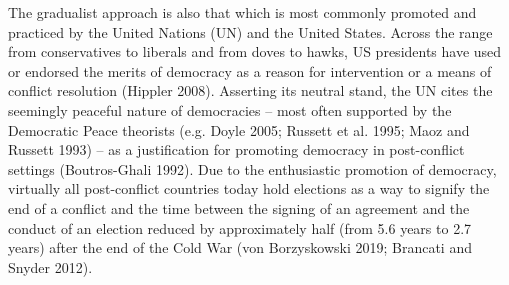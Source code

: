 \documentclass [11pt]{article}
\begin{document}
The gradualist approach is also that which is most commonly promoted and practiced by the United Nations (UN) and the United States. Across the range from conservatives to liberals and from doves to hawks, US presidents have used or endorsed the merits of democracy as a reason for intervention or a means of conflict resolution (Hippler 2008). Asserting its neutral stand, the UN cites the seemingly peaceful nature of democracies -- most often supported by the Democratic Peace theorists (e.g. Doyle 2005; Russett et al. 1995; Maoz and Russett 1993) -- as a justification for promoting democracy in post-conflict settings (Boutros-Ghali 1992). Due to the enthusiastic promotion of democracy, virtually all post-conflict countries today hold elections as a way to signify the end of a conflict and the time between the signing of an agreement and the conduct of an election reduced by approximately half (from 5.6 years to 2.7 years) after the end of the Cold War (von Borzyskowski 2019; Brancati and Snyder 2012).

\end{document}
